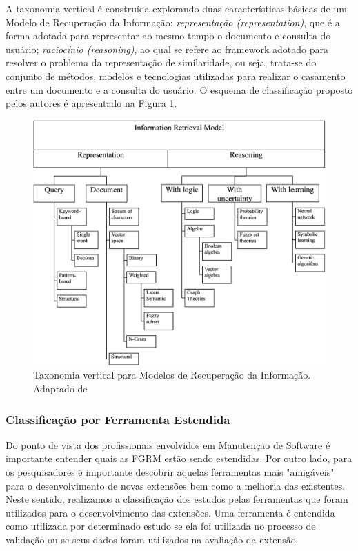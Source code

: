 \documentclass[msc]{ppgccufmg} %
\begin{document}

A taxonomia vertical é construída explorando duas características básicas de um Modelo de
Recuperação da Informação: \textit{representação (representation)}, que é a forma adotada para representar ao mesmo
tempo o documento e consulta do usuário; \textit{raciocínio (reasoning)}, ao qual se refere ao framework adotado
para resolver o problema da representação de similaridade, ou seja, trata-se do conjunto de métodos, modelos e tecnologias utilizadas para realizar o casamento entre um documento e a consulta do usuário. O esquema de classificação proposto pelos autores é apresentado na Figura \ref{fig:information-retrieval-model}.

\begin{figure}[htpb]
	\centering
	\includegraphics[width=0.8\linewidth]{../img/information-retrieval-model.png}
	\caption{Taxonomia vertical para Modelos de Recuperação da Informação. Adaptado de \cite{cerulo2004taxonomy}}
	\label{fig:information-retrieval-model}
\end{figure}

\subsubsection{Classificação por Ferramenta Estendida}
\label{subsubsec:map-esquema-ferramenta}

Do ponto de vista dos profissionais envolvidos em Manutenção de Software é importante entender quais as FGRM estão sendo estendidas. Por outro lado, para os pesquisadores é importante descobrir aquelas ferramentas mais "amigáveis" para o desenvolvimento de novas extensões bem como a melhoria das existentes. Neste sentido, realizamos a classificação dos estudos pelas ferramentas que foram utilizados para o desenvolvimento das extensões. Uma ferramenta é entendida como utilizada por determinado estudo se ela foi utilizada no processo de validação ou se seus dados foram utilizados na avaliação da extensão. 
\end{document}

